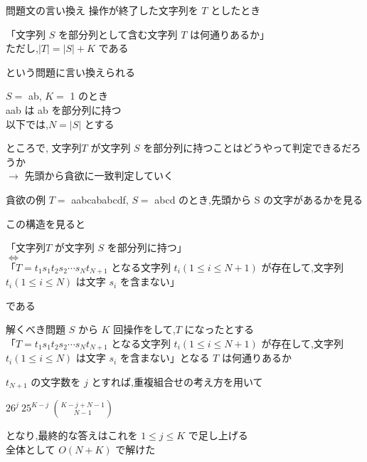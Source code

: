 \documentclass[dvipdfmx,12pt]{beamer}%
\begin{document}
\begin{frame}
\begin{alertblock}{問題文の言い換え}
操作が終了した文字列を $ T $ としたとき \\
\begin{center}
「文字列 $ S $ を部分列として含む文字列 $ T $ は何通りあるか」\\
ただし,$ |T| = |S| + K $ である
\end{center}
という問題に言い換えられる
\end{alertblock}
$S =$ ab, $K = $ 1 のとき \\
aab は ab を部分列に持つ　\\
以下では,$ N = |S|$ とする

\end{frame}

\begin{frame}
ところで, 文字列$ T $ が文字列 $ S $ を部分列に持つことはどうやって判定できるだろうか\\
$ \longrightarrow $ 先頭から貪欲に一致判定していく \\

\begin{exampleblock}{貪欲の例}
	$ T = $ aabcababcdf, $ S = $ abcd のとき,先頭から S  の文字があるかを見る 
\end{exampleblock}

この構造を見ると \\
\begin{center}
「文字列$ T $ が文字列 $ S $ を部分列に持つ」\\
$ \Leftrightarrow $ \\
「$ T = t_1 s_1 t_2 s_2 \cdots s_N t_{N+1} $ となる文字列 $ t_i (1 \leq i \leq N + 1) $ が存在して,文字列 $ t_i (1 \leq i \leq N)$ は文字 $ s_i $ を含まない」
\end{center}
である
\end{frame}

\begin{frame}
\begin{block}{解くべき問題}
$ S $ から $ K $ 回操作をして,$ T $ になったとする \\
「$ T = t_1 s_1 t_2 s_2 \cdots s_N t_{N+1} $ となる文字列 $ t_i (1 \leq i \leq N + 1) $ が存在して,文字列 $ t_i (1 \leq i \leq N)$ は文字 $ s_i $ を含まない」となる $ T $ は何通りあるか
\end{block}
$ t_{N + 1} $ の文字数を $ j $ とすれば,重複組合せの考え方を用いて

\begin{center}
	$26^{j} \ 25^{K - j} \ \binom{K - j + N - 1}{N - 1}$
\end{center}
となり,最終的な答えはこれを $ 1 \leq j \leq K $ で足し上げる\\
全体として $O(N + K)$ で解けた
\end{frame}
\end{document}
